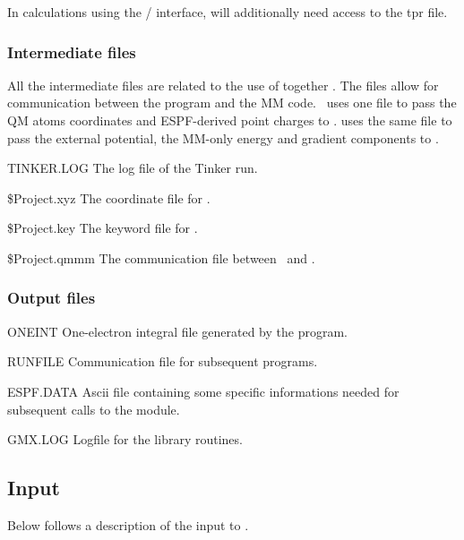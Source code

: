 In calculations using the \molcas/ interface,  will additionally need access to the  tpr file.

\subsubsection{Intermediate files}

All the intermediate files are related to the use of  together . The files allow for communication between the  program and the MM code. \molcas\ uses one file to pass the QM atoms coordinates and ESPF-derived point charges to .  uses the same file to pass the external potential, the MM-only energy and gradient components to \molcas.

\begin{filelist}
\item[TINKER.LOG]
The log file of the Tinker run.
\item[\$Project.xyz]
The coordinate file for .
\item[\$Project.key]
The keyword file for .
\item[\$Project.qmmm]
The communication file between \molcas\ and .
\end{filelist}

\subsubsection{Output files}

\begin{filelist}
\item[ONEINT]
One{}-electron integral file generated by the  program.
\item[RUNFILE]
Communication file for subsequent programs.
\item[ESPF.DATA]
Ascii file containing some specific informations needed for subsequent calls to the  module.
\item[GMX.LOG]
Logfile for the  library routines.
\end{filelist}

\subsection{Input}
\label{UG:sec:espf_input}
Below follows a description of the input to .

